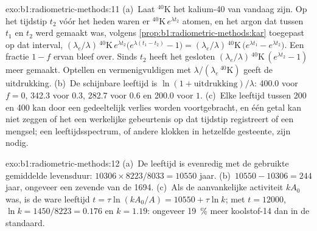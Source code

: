 \begin{solution}{exo:b1:radiometric-methods:11}
(a)~Laat ${}^{40}\mathrm{K}$ het kalium-40 van vandaag zijn. Op het tijdstip $t_2$ vóór het heden waren er ${}^{40}\mathrm{K}\,e^{\lambda t_2}$ atomen, en het argon dat tussen $t_1$ en $t_2$ werd gemaakt was, volgens \cref{prop:b1:radiometric-methods:kar} toegepast op dat interval,
$(\lambda_e/\lambda)\,{}^{40}\mathrm{K}\,e^{\lambda
t_2}\bigl(e^{\lambda (t_1 - t_2)} - 1\bigr) = (\lambda_e/\lambda)\,
{}^{40}\mathrm{K}\,\bigl(e^{\lambda t_1} - e^{\lambda t_2}\bigr)$. Een fractie
$1 - f$ ervan bleef over. Sinds $t_2$ heeft het gesloten 
$(\lambda_e/\lambda)\,{}^{40}\mathrm{K}\,(e^{\lambda t_2} - 1)$ meer gemaakt. Optellen en
vermenigvuldigen met $\lambda/(\lambda_e\,{}^{40}\mathrm{K})$ geeft de uitdrukking.
(b)~De schijnbare leeftijd is $\ln(1 + \text{uitdrukking})/\lambda$: \qty{400.0}{\Myr} voor
$f = 0$, \qty{342.3}{\Myr} voor $0.3$, \qty{282.7}{\Myr} voor $0.6$ en
\qty{200.0}{\Myr} voor $1$. (c)~Elke leeftijd tussen \qty{200}{\Myr} en
\qty{400}{\Myr} kan door een gedeeltelijk verlies worden voortgebracht, en één getal kan niet
zeggen of het een werkelijke gebeurtenis op dat tijdstip registreert of een mengsel; een leeftijdsspectrum,
of andere klokken in hetzelfde gesteente, zijn nodig.
\end{solution}

\begin{solution}{exo:b1:radiometric-methods:12}
(a)~De leeftijd is evenredig met de gebruikte gemiddelde levensduur: $10306 \times 8223/8033 =
\num{10550}$ jaar. (b)~$10550 - 10306 = 244$ jaar, ongeveer een zevende van de
\num{1694}. (c)~Als de aanvankelijke activiteit $k A_0$ was, is de ware leeftijd $t = \tau
\ln(k A_0/A) = \num{10550} + \tau \ln k$; met $t = \num{12000}$, $\ln k =
1450/8223 = 0.176$ en $k = 1.19$: ongeveer \qty{19}{\percent} meer koolstof-14 dan
in de standaard.
\end{solution}

